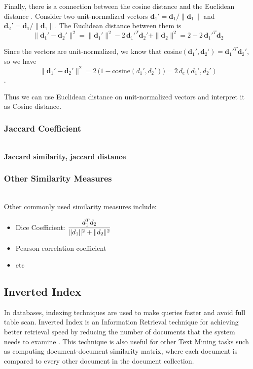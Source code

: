 Finally, there is a connection between the cosine distance and the Euclidean
distance \cite{korenius2007principal}.
Consider two unit-normalized vectors $\mathbf d_1' = \mathbf d_1 / \| \mathbf d_1 \|$ and
$\mathbf d_2' = \mathbf d_1 / \| \mathbf d_1 \|$.
The Euclidean distance between them is
$$\| \mathbf d_1' - \mathbf d_2' \|^2 = \| \mathbf d_1' \|^2 - 2 \, \mathbf d_1'^T \mathbf d_2' + \| \mathbf d_2 \|^2 = 2 - 2 \, \mathbf d_1'^T \mathbf d_2$$

Since the vectors are unit-normalized, we know that
$\text{cosine}(\mathbf d_1', \mathbf d_2') = \mathbf d_1'^T \mathbf d_2'$, so we have
$$\| \mathbf d_1' - \mathbf d_2' \|^2 = 2 \, \big(1 - \text{cosine}(d_1', d_2')\big) = 2 \, d_c(d_1', d_2')$$.


Thus we can use Euclidean distance on unit-normalized vectors
and interpret it as Cosine distance.


\subsubsection{Jaccard Coefficient} \ \\

\textbf{Jaccard similarity, jaccard distance}


\subsubsection{Other Similarity Measures} \ \\


Other commonly used similarity measures include:

\begin{itemize}
  \item Dice Coefficient: $\cfrac{d_1^T d_2}{\|d_1\|^2 + \| d_2\|^2}$
  \item Pearson correlation coefficient
  \item etc
\end{itemize}


\subsection{Inverted Index} \label{sec:index}

In databases, indexing techniques are used to make queries faster and
avoid full table scan. Inverted Index is an Information Retrieval technique
for achieving better retrieval speed by reducing the number of documents that
the system needs to examine \cite{manning2008introduction}.
This technique is also
useful for other Text Mining tasks such as computing document-document
similarity matrix, where each document is compared to every other document
in the document collection.

